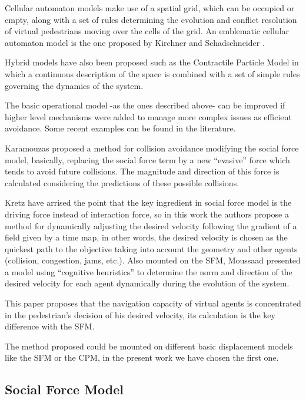 \documentclass[draftclsnofoot]{IEEEtran}
\begin{document}
Cellular automaton models make use of a spatial grid, which can be
occupied or empty, along with a set of rules determining the evolution
and conflict resolution of virtual pedestrians moving over the cells
of the grid. An emblematic cellular automaton model is the one proposed
by Kirchner and Schadschneider \cite{key-kirc2002}.

Hybrid models have also been proposed such as the Contractile Particle
Model \cite{key-pari2011} in which a continuous description
of the space is combined with a set of simple rules governing the
dynamics of the system.

The basic operational model -as the ones described above- can be improved
if higher level mechanisms were added to manage more complex issues
as efficient avoidance. Some recent examples can be found in the literature.

Karamouzas \cite{key-kara2009} proposed a method for collision avoidance
modifying the social force model, basically, replacing the social
force term by a new ``evasive\textquotedblright{} force which tends
to avoid future collisions. The magnitude and direction of this force
is calculated considering the predictions of these possible collisions.

Kretz \cite{key-kret2001} have arrised the point that the key ingredient in
social force model is the driving force instead of interaction force,
so in this work the authors propose a method for dynamically adjusting
the desired velocity following the gradient of a field given by a
time map, in other words, the desired velocity is chosen as the quickest
path to the objective taking into account the geometry and other agents
(collision, congestion, jams, etc.). Also mounted on the SFM, Moussaad
\cite{key-mous2009} presented a model using ``cognitive heuristics''
to determine the norm and direction of the desired velocity for each
agent dynamically during the evolution of the system.

This paper proposes that the navigation capacity of
virtual agents is concentrated in the pedestrian's decision of his
desired velocity, its calculation is the key difference with the SFM.

The method proposed could be mounted on different basic displacement
models like the SFM or the CPM, in the present work we have chosen
the first one.


\subsection{Social Force Model}
\end{document}
